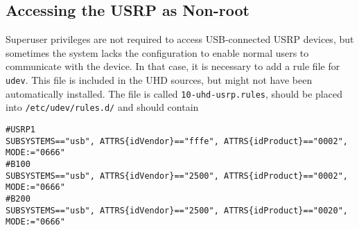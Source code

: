 \subsection{Accessing the USRP as Non-root}

Superuser privileges are not required to access USB-connected USRP devices, but
sometimes the system lacks the configuration to enable normal users to
communicate with the device.
In that case, it is necessary to add a rule file for \texttt{udev}. This file is
included in the UHD sources, but might not have been automatically installed.
The file is called \texttt{10-uhd-usrp.rules}, should be placed into
\texttt{/etc/udev/rules.d/} and should contain

{ \footnotesize
\begin{verbatim}
#USRP1
SUBSYSTEMS=="usb", ATTRS{idVendor}=="fffe", ATTRS{idProduct}=="0002", MODE:="0666"
#B100
SUBSYSTEMS=="usb", ATTRS{idVendor}=="2500", ATTRS{idProduct}=="0002", MODE:="0666"
#B200
SUBSYSTEMS=="usb", ATTRS{idVendor}=="2500", ATTRS{idProduct}=="0020", MODE:="0666"
\end{verbatim}
}

